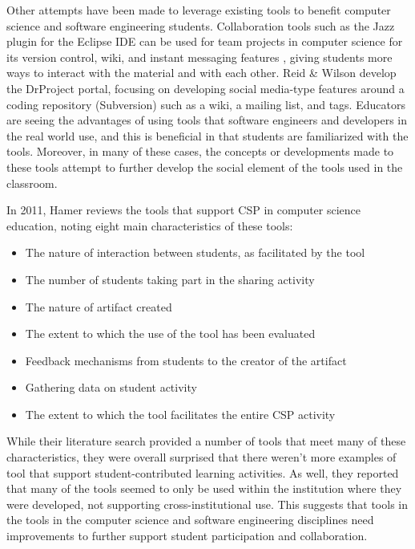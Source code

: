 Other attempts have been made to leverage existing tools to benefit computer science and software engineering students. Collaboration tools such as the Jazz plugin for the Eclipse IDE can be used for team projects in computer science for its version control, wiki, and instant messaging features \cite{meneely2009preparing}, giving students more ways to interact with the material and with each other. Reid \& Wilson \cite{reid2007drproject} develop the DrProject portal, focusing on developing social media-type features around a coding repository (Subversion) such as a wiki, a mailing list, and tags. Educators are seeing the advantages of using tools that software engineers and developers in the real world use, and this is beneficial in that students are familiarized with the tools. Moreover, in many of these cases, the concepts or developments made to these tools attempt to further develop the social element of the tools used in the classroom.

In 2011, Hamer \cite{hamer2011tools} reviews the tools that support CSP in computer science education, noting eight main characteristics of these tools:
\begin{itemize}
\item The nature of interaction between students, as facilitated by the tool
\item The number of students taking part in the sharing activity
\item The nature of artifact created
\item The extent to which the use of the tool has been evaluated
\item Feedback mechanisms from students to the creator of the artifact
\item Gathering data on student activity
\item The extent to which the tool facilitates the entire CSP activity
\end{itemize}

While their literature search provided a number of tools that meet many of these characteristics, they were overall surprised that there weren’t more examples of tool that support student-contributed learning activities. As well, they reported that many of the tools seemed to only be used within the institution where they were developed, not supporting cross-institutional use. This suggests that tools in the tools in the computer science and software engineering disciplines need improvements to further support student participation and collaboration.


